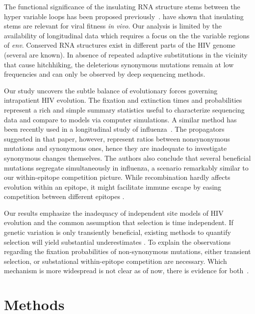 \documentclass[rmp, twocolumn]{revtex4}
\newcommand{\env}{\textit{env}}
\begin{document}
The functional significance of the insulating RNA structure stems between the
hyper variable loops has been proposed
previously~\citep{watts_architecture_2009, sanjuan_interplay_2011}.
\citet{sanjuan_interplay_2011} have shown that insulating stems are relevant for
viral fitness {\it in vivo}. Our analysis is limited by the availability of
longitudinal data which requires a focus on the the variable regions of \env.
Conserved RNA structures exist in different parts of the HIV genome (several are
known). In absence of repeated adaptive substitutions in the vicinity that cause
hitchhiking, the deleterious synonymous mutations remain at low frequencies and
can only be observed by deep sequencing methods. 

Our study uncovers the
subtle balance of evolutionary forces governing intrapatient HIV evolution. The
fixation and extinction times and probabilities represent a rich and simple
summary statistics useful to characterize sequencing data and compare to
models via computer simulations.
A similar method has been recently used in a longitudinal study of
influenza~\citep{strelkowa_clonal_2012}. The propagators suggested in that
paper, however, represent ratios between nonsynonymous
mutations and synonymous ones, hence they are inadequate to investigate
synonymous changes themselves. The authors also conclude that several
beneficial mutations segregate simultaneously in influenza, a scenario
remarkably similar to our within-epitope competition picture. While
recombination hardly affects evolution within an epitope, it might facilitate
immune escape by easing competition between different epitopes
\citep{neher_rate_2010,Rouzine:2005p17398}.

Our results emphasize the inadequacy of independent site
models of HIV evolution and the common assumption that selection is time
independent. If genetic variation is only transiently beneficial, existing
methods to quantify selection will yield substantial underestimates
\citep{williamson_adaptation_2003,neher_rate_2010,OTHER}. To explain the
observations regarding the fixation probabilities of non-synonymous mutations,
either transient selection, or substational within-epitope competition are
necessary. Which mechanism is more widespread is not clear as of now,
there is evidence for both~\citep{richman_rapid_2003, moore_limited_2009,
bar_early_2012}.

\section{Methods}
\end{document}
